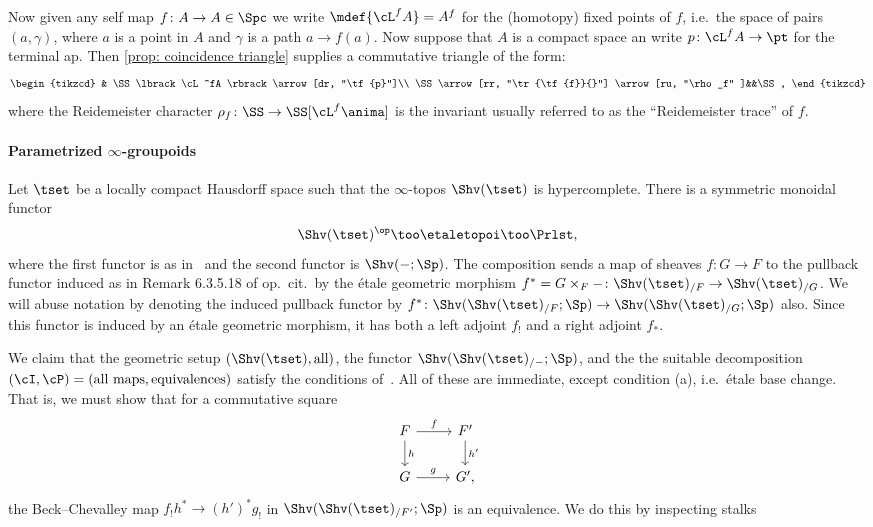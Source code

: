 Now given any self map $f\colon A\to A \in \Spc$ we write
$\mdef{\cL^fA} = A^f$ for the (homotopy) fixed points of $f$, i.e.~the space of pairs $(a,\gamma )$, where $a$ is a point in $A$ and $\gamma$ is a path $a\to f(a)$. 
Now suppose that $A$ is a compact space an write $p\colon \cL^fA\to \pt$ for the terminal ap.
Then \cref{prop: coincidence triangle} supplies a commutative triangle of the form:
  \begin{equation}
    \label{eq:homotopical-lefschetz-trace}
    \begin{tikzcd}
      & \SS\lbrack \cL^fA \rbrack\arrow[dr, "\tf{p}"]\\
      \SS\arrow[rr, "\tr{\tf{f}}{}"] \arrow[ru, "\rho_f" ]&&\SS,
    \end{tikzcd}
  \end{equation}
  where the Reidemeister character $\rho_f \colon \SS\to\SS\lbrack \cL^f\anima\rbrack$ is the invariant usually referred to as the ``Reidemeister trace'' of $f$. 
  
\paragraph{Parametrized $\infty$-groupoids}
  Let $\tset$ be a locally compact Hausdorff space such that the $\infty$-topos $\Shv (\tset )$ is hypercomplete. There is a symmetric monoidal functor
  \[
    \Shv (\tset )^\op\too\etaletopoi\too\Prlst,
  \]
  where the first functor is as in~\cite[Rem~6.3.5.10]{Lurie2009} and the second functor is $\Shv ({-};\Sp )$. The composition sends a map of sheaves $f\colon G\to F$ to the pullback functor induced as in Remark 6.3.5.18 of op.~cit.~by the \'etale geometric morphism $f^*=G\times_F{-}\colon\Shv (\tset )_{/F}\to\Shv (\tset )_{/G}$. We will abuse notation by denoting the induced pullback functor by $f^*\colon\Shv (\Shv (\tset )_{/F};\Sp)\to\Shv (\Shv (\tset )_{/G};\Sp )$ also. Since this functor is induced by an \'etale geometric morphism, it has both a left adjoint $f_!$ and a right adjoint $f_*$. 
  
  We claim that the geometric setup $(\Shv (\tset ),\textrm{all})$, the functor $\Shv (\Shv (\tset )_{/{-}};\Sp )$, and the the suitable decomposition $(\cI ,\cP ) = (\textrm{all maps},\textrm{equivalences})$ satisfy the conditions of~\cite[Prop~A.5.10]{Mann2022}. All of these are immediate, except condition (a), i.e.~\'etale base change. That is, we must show that for a commutative square
  \[
    \begin{tikzcd}
      F\arrow[r,"f"]\arrow[d,"h"] & F'\arrow[d,"h'"]\\
      G\arrow[r,"g"] & G',
    \end{tikzcd}
  \]
  the Beck--Chevalley map $f_!h^*\to (h')^*g_!$ in $\Shv (\Shv (\tset )_{/F'};\Sp )$ is an equivalence. We do this by inspecting stalks 
  
